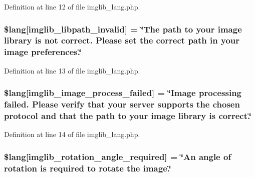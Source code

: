 Definition at line 12 of file imglib\+\_\+lang.\+php.

\subsubsection[{\texorpdfstring{\$lang}{$lang}}]{\setlength{\rightskip}{0pt plus 5cm}\$lang\mbox{[}\textquotesingle{}imglib\+\_\+libpath\+\_\+invalid\textquotesingle{}\mbox{]} = \char`\"{}The path to your image library is not correct. Please set the correct path in your image preferences.\char`\"{}}\hypertarget{system_2language_2english_2imglib__lang_8php_a8f190c17a02ca89334c8bf0a04333f65}{}\label{system_2language_2english_2imglib__lang_8php_a8f190c17a02ca89334c8bf0a04333f65}


Definition at line 13 of file imglib\+\_\+lang.\+php.

\subsubsection[{\texorpdfstring{\$lang}{$lang}}]{\setlength{\rightskip}{0pt plus 5cm}\$lang\mbox{[}\textquotesingle{}imglib\+\_\+image\+\_\+process\+\_\+failed\textquotesingle{}\mbox{]} = \char`\"{}Image processing failed. Please verify that your server supports the chosen protocol and that the path to your image library is correct.\char`\"{}}\hypertarget{system_2language_2english_2imglib__lang_8php_a9ac6659eb97dd12e5c714cc9635cf22e}{}\label{system_2language_2english_2imglib__lang_8php_a9ac6659eb97dd12e5c714cc9635cf22e}


Definition at line 14 of file imglib\+\_\+lang.\+php.

\subsubsection[{\texorpdfstring{\$lang}{$lang}}]{\setlength{\rightskip}{0pt plus 5cm}\$lang\mbox{[}\textquotesingle{}imglib\+\_\+rotation\+\_\+angle\+\_\+required\textquotesingle{}\mbox{]} = \char`\"{}An angle of rotation is required to rotate the image.\char`\"{}}\hypertarget{system_2language_2english_2imglib__lang_8php_a1110d59ea8fd0564e78068dbda3438fb}{}\label{system_2language_2english_2imglib__lang_8php_a1110d59ea8fd0564e78068dbda3438fb}


